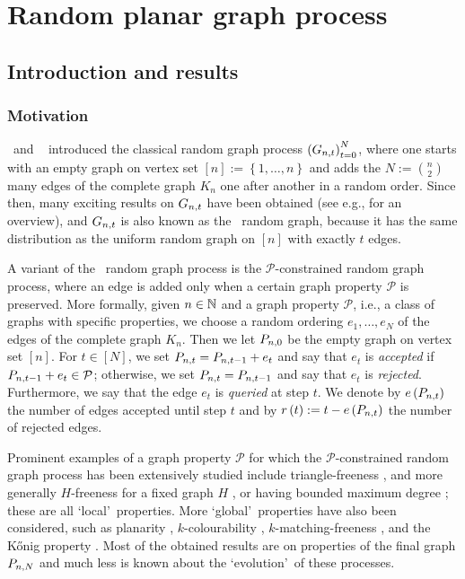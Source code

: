 
\chapter{Random planar graph process}\label{cha:process}

\section{Introduction and results}\label{PPsec:intro}
\subsection{Motivation}\label{PPsubsec:motivation}
\Erdos\ and \Renyi\ \cite{ErdoesRenyi1959,ErdoesRenyi1960} introduced the classical random graph process $\left(G_{n,t}\right)_{t=0}^{N}$, where one starts with an empty graph on vertex set $[n]:=\left\{1, \ldots, n\right\}$ and adds the $N:=\binom{n}{2}$ many edges of the complete graph $K_n$ one after another in a random order. Since then, many exciting results on $G_{n,t}$ have been obtained (see e.g., \cite{Bollobas2001,JansonLuczakRucinski2000,FriezeKaronski2016} for an overview), and $G_{n,t}$ is also known as the \ER\ random graph, because it has the same distribution as the uniform random graph on $[n]$ with exactly $t$ edges.

A variant of the \ER\ random graph process is the $\mathcal{P}$-constrained random graph process, where an edge is added only when a certain graph property $\mathcal{P}$ is preserved. More formally, given $n\in\mathbb{N}$ and a graph property $\mathcal{P}$, i.e., a class of graphs with specific properties, we choose a random ordering $e_1, \ldots, e_{N}$ of the edges of the complete graph $K_n$. Then we let $P_{n,0}$ be the empty graph on vertex set $[n]$. For $t\in\left[N\right]$, we set $P_{n,t}=P_{n,t-1}+e_t$ and say that $e_t$ is \textit{accepted} if $P_{n,t-1}+e_t\in \mathcal{P}$; otherwise, we set $P_{n,t}=P_{n,t-1}$ and say that $e_t$ is \textit{rejected}. Furthermore, we say that the edge $e_t$ is \textit{queried} at step $t$. We denote by $e\left({P_{n,t}}\right)$ the number of edges accepted until step $t$ and by $r\left(t\right):=t-e\left({P_{n,t}}\right)$ the number of rejected edges.

Prominent examples of a graph property $\mathcal{P}$ for which the $\mathcal{P}$-constrained random graph process has been extensively studied include triangle-freeness \cite{ErdoesSuenWinkler1993,Bohman2009,FizPontiverosGriffithsMorris2020}, and more generally $H$-freeness for a fixed graph $H$ \cite{OsthusTaraz2001,BohmanKeevash2010,BollobasRiordan2000}, or having bounded maximum degree \cite{RucinskiWormald1992,RucinskiWormald1997}; these are all \lq local\rq\ properties. More \lq global\rq\ properties have also been considered, such as planarity \cite{GerkeSchlatterStegerTaraz2008}, $k$-colourability \cite{KrivelevichSudakovVilenchik2009}, $k$-matching-freeness \cite{KrivelevichKwanLohSudakov2018}, and the {K}{\H{o}}nig property \cite{KamcevKrivelevichMorrisonSudakov2020}. Most of the obtained results are on properties of the final graph $P_{n,N}$ and much less is known about the \lq evolution\rq\ of these processes.

